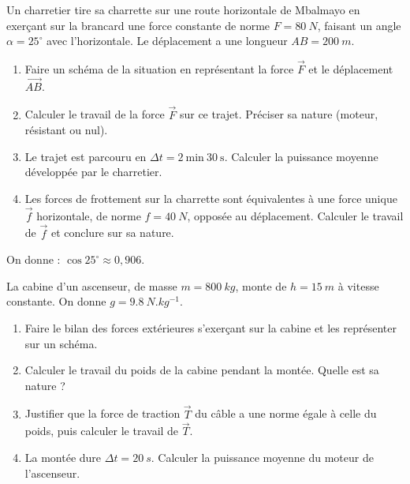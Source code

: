 \documentclass[11pt]{article}
\newcounter{popsec}
\newcounter{popsub}
\newcommand{\courssub}[1]{%
  \stepcounter{popsub}%
  \par\vspace{9pt}\noindent{\popxbold\fontsize{11.5}{13}\selectfont\color{popink}{\color{poporange}\thepopsec.\thepopsub}\hspace{6pt}#1}\par\nopagebreak\vspace{4pt}
}
\begin{document}
\courssub{Je m'entraîne}

\begin{exercice}
Un charretier tire sa charrette sur une route horizontale de Mbalmayo en exerçant sur la brancard une force constante de norme $F = \SI{80}{N}$, faisant un angle $\alpha = 25^{\circ}$ avec l'horizontale. Le déplacement a une longueur $AB = \SI{200}{m}$.
\begin{enumerate}
\item Faire un schéma de la situation en représentant la force $\vec{F}$ et le déplacement $\overrightarrow{AB}$.
\item Calculer le travail de la force $\vec{F}$ sur ce trajet. Préciser sa nature (moteur, résistant ou nul).
\item Le trajet est parcouru en $\Delta t = 2~\text{min}~30~\text{s}$. Calculer la puissance moyenne développée par le charretier.
\item Les forces de frottement sur la charrette sont équivalentes à une force unique $\vec{f}$ horizontale, de norme $f = \SI{40}{N}$, opposée au déplacement. Calculer le travail de $\vec{f}$ et conclure sur sa nature.
\end{enumerate}
On donne : $\cos 25^{\circ} \approx 0,906$.
\end{exercice}

\begin{exercice}
La cabine d'un ascenseur, de masse $m = \SI{800}{kg}$, monte de $h = \SI{15}{m}$ à vitesse constante. On donne $g = \SI{9,8}{N.kg^{-1}}$.
\begin{enumerate}
\item Faire le bilan des forces extérieures s'exerçant sur la cabine et les représenter sur un schéma.
\item Calculer le travail du poids de la cabine pendant la montée. Quelle est sa nature ?
\item Justifier que la force de traction $\vec{T}$ du câble a une norme égale à celle du poids, puis calculer le travail de $\vec{T}$.
\item La montée dure $\Delta t = \SI{20}{s}$. Calculer la puissance moyenne du moteur de l'ascenseur.
\end{enumerate}
\end{exercice}
\end{document}
